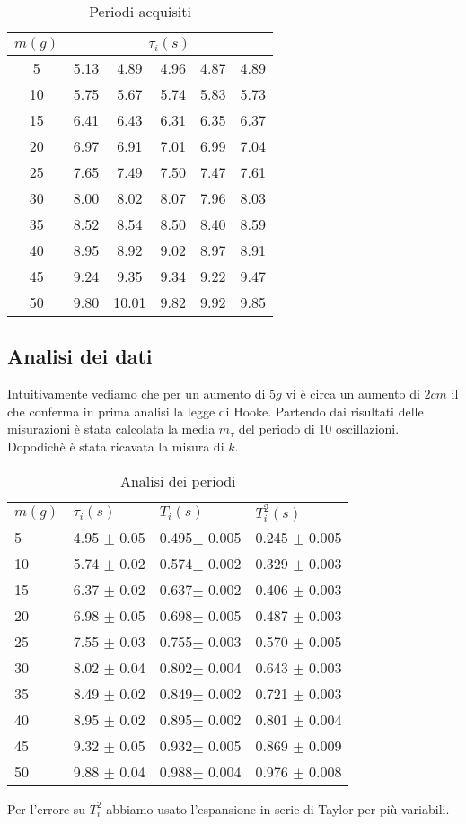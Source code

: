 \documentclass[a4paper,10pt]{article}
\begin{document}
\begin{table}[!htb]
\centering
\caption{Periodi acquisiti}
\label{my-label}
\begin{tabular}{c|ccccc}
$m(g)$ & \multicolumn{5}{c|}{$\tau_i(s)$}  \\ \hline
5    & 5.13 & 4.89  & 4.96 & 4.87 & 4.89 \\
10   & 5.75 & 5.67  & 5.74 & 5.83 & 5.73 \\
15   & 6.41 & 6.43  & 6.31 & 6.35 & 6.37 \\
20   & 6.97 & 6.91  & 7.01 & 6.99 & 7.04 \\
25   & 7.65 & 7.49  & 7.50 & 7.47 & 7.61 \\
30   & 8.00 & 8.02  & 8.07 & 7.96 & 8.03 \\
35   & 8.52 & 8.54  & 8.50 & 8.40 & 8.59 \\
40   & 8.95 & 8.92  & 9.02 & 8.97 & 8.91 \\
45   & 9.24 & 9.35  & 9.34 & 9.22 & 9.47 \\
50   & 9.80 &10.01  & 9.82 & 9.92 & 9.85
\end{tabular}
\end{table}


\subsection{Analisi dei dati}
Intuitivamente vediamo che per un aumento di $5g$ vi è circa un aumento di $2cm$ il che conferma in prima analisi la legge di Hooke.
Partendo dai risultati delle misurazioni è stata calcolata la media $m_{\tau}$ del periodo di 10 oscillazioni.
Dopodichè è stata ricavata la misura di $k$. 

\begin{table}[!htb]
\centering
\caption{Analisi dei periodi}
\label{my-label}
\begin{tabular}{llll}
$m(g)$ & $\tau_i(s)$ & $T_i(s)$      & $T_i^2(s)$    \\
5      & 4.95 $\pm$ 0.05 & 0.495$\pm$ 0.005 & 0.245 $\pm$ 0.005 \\
10     & 5.74 $\pm$ 0.02 & 0.574$\pm$ 0.002 & 0.329 $\pm$ 0.003 \\
15     & 6.37 $\pm$ 0.02 & 0.637$\pm$ 0.002 & 0.406 $\pm$ 0.003 \\
20     & 6.98 $\pm$ 0.05 & 0.698$\pm$ 0.005 & 0.487 $\pm$ 0.003 \\
25     & 7.55 $\pm$ 0.03 & 0.755$\pm$ 0.003 & 0.570 $\pm$ 0.005 \\
30     & 8.02 $\pm$ 0.04 & 0.802$\pm$ 0.004 & 0.643 $\pm$ 0.003 \\
35     & 8.49 $\pm$ 0.02 & 0.849$\pm$ 0.002 & 0.721 $\pm$ 0.003 \\
40     & 8.95 $\pm$ 0.02 & 0.895$\pm$ 0.002 & 0.801 $\pm$ 0.004 \\
45     & 9.32 $\pm$ 0.05 & 0.932$\pm$ 0.005 & 0.869 $\pm$ 0.009 \\
50     & 9.88 $\pm$ 0.04 & 0.988$\pm$ 0.004 & 0.976 $\pm$ 0.008
\end{tabular}
\end{table}
\pagebreak
Per l'errore su $T_i^2$ abbiamo usato l'espansione in serie di Taylor per più variabili.
\end{document}
